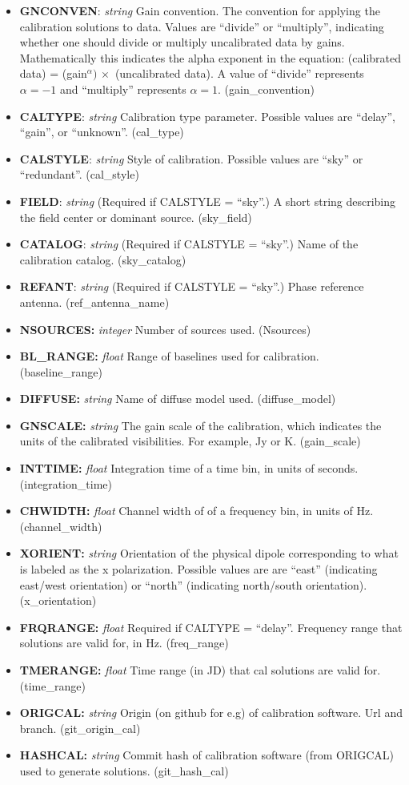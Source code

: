 \documentclass[11pt, oneside, english]{article}   	%
\begin{document}
\begin{itemize}
\item{\textbf{GNCONVEN}: \emph{string} Gain convention. The convention for applying the calibration solutions to data.
Values are ``divide'' or ``multiply'', indicating whether one should divide or multiply uncalibrated data by gains. 
Mathematically this indicates the alpha exponent in the equation: 
    (calibrated data) = (gain$^{\alpha}) \,  \times $ (uncalibrated data). A value of
    ``divide'' represents $\alpha=-1$ and ``multiply'' represents $\alpha=1$. (gain\_convention)}
\item{\textbf{CALTYPE}: \emph{string} Calibration type parameter. Possible values are ``delay'', ``gain'', or ``unknown''. (cal\_type)}
\item{\textbf{CALSTYLE}: \emph{string} Style of calibration. Possible values are ``sky'' or ``redundant''. (cal\_style)}
\item{\textbf{FIELD}: \emph{string} (Required if CALSTYLE = ``sky''.) A short string describing the field center or dominant source. (sky\_field)}
\item{\textbf{CATALOG}: \emph{string} (Required if CALSTYLE = ``sky''.) Name of the calibration catalog. (sky\_catalog)}
\item{\textbf{REFANT}: \emph{string} (Required if CALSTYLE = ``sky''.) Phase reference antenna. (ref\_antenna\_name)}
\item{\textbf{NSOURCES:} \emph{integer} Number of sources used. (Nsources)}
\item{\textbf{BL\_RANGE:} \emph{float} Range of baselines used for calibration. (baseline\_range)}
\item{\textbf{DIFFUSE:} \emph{string} Name of diffuse model used. (diffuse\_model)}
\item{\textbf{GNSCALE:} \emph{string} The gain scale of the calibration, which indicates the units of the calibrated visibilities. For example, Jy or K. (gain\_scale)}
\item{\textbf{INTTIME:} \emph{float} Integration time of a time bin, in units of seconds. (integration\_time)}
\item{\textbf{CHWIDTH:} \emph{float} Channel width of of a frequency bin, in units of Hz. (channel\_width)}
\item{\textbf{XORIENT:} \emph{string} Orientation of the physical dipole corresponding to what is labeled as the x polarization. Possible values are are ``east'' (indicating east/west orientation) or ``north'' (indicating north/south orientation). (x\_orientation)}
\item{\textbf{FRQRANGE:} \emph{float} Required if CALTYPE = ``delay''. Frequency range that solutions are valid for, in Hz. (freq\_range)}
\item{\textbf{TMERANGE:} \emph{float} Time range (in JD) that cal solutions are valid for. (time\_range)}
\item{\textbf{ORIGCAL:} \emph{string} Origin (on github for e.g) of calibration software. Url and branch. (git\_origin\_cal)}
\item{\textbf{HASHCAL:} \emph{string} Commit hash of calibration software (from ORIGCAL) used to generate solutions. (git\_hash\_cal)}


\end{itemize}
\end{document}

